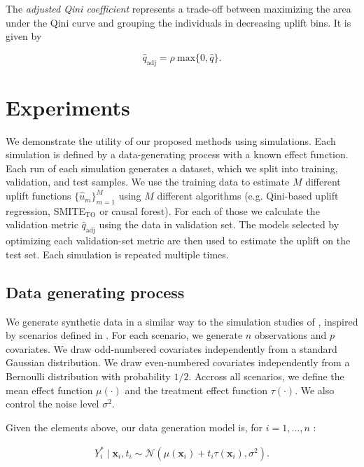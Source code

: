\documentclass{article}
\def\qadj{\hat{q}_{\mathrm{adj}}}
\def\x{\mathbf x}
\begin{document}
The \textit{adjusted Qini coefficient} represents a trade-off between maximizing the area under the Qini curve and grouping the individuals in decreasing uplift bins. It is given by

\begin{equation}
    \qadj = \rho~\mathrm{max}\{ 0, \hat{q}\}.
    \label{eq:qadj}
\end{equation}


\section{Experiments}
\label{sec:experiments}

We demonstrate the utility of our proposed methods using simulations. Each simulation is defined by a data-generating process with a known effect function. Each run of each simulation generates
a dataset, which we split into training, validation, and test samples. We use
the training data to estimate $M$ different uplift functions $\{\hat{u}_m\}_{m=1}^M$ using
$M$ different algorithms (e.g. Qini-based uplift regression, SMITE$_{\mathrm{TO}}$ or causal forest). For each of those we calculate the validation metric $\qadj$ using the data in validation set. The models selected by optimizing each validation-set metric are then used to estimate the uplift on the test set. Each simulation is repeated multiple times. 

\subsection{Data generating process}

We generate synthetic data in a similar way to the simulation studies of \cite{tian2014simple}, inspired by scenarios defined in \cite{powers2018some}. For each scenario, we generate $n$ observations and $p$ covariates. We draw odd-numbered covariates independently from a standard Gaussian distribution. We draw even-numbered covariates independently from a
Bernoulli distribution with probability $1/2$. Accross all scenarios, we define the mean effect function $\mu(\cdot)$ and the treatment effect function $\tau(\cdot)$. We also control the noise level $\sigma^2$.

Given the elements above, our data generation model is, for $i=1,...,n$ :

\begin{align*}
    Y_i^* \mid \x_i, t_i \sim \mathcal{N}(\mu(\x_i) + t_i\tau(\x_i), \sigma^2).
\end{align*}
\end{document}
